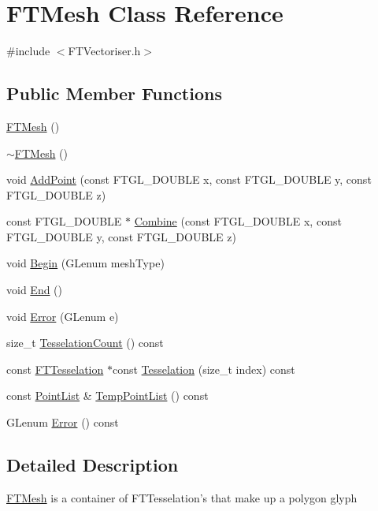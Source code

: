 \hypertarget{class_f_t_mesh}{
\section{FTMesh Class Reference}
\label{class_f_t_mesh}
}


{\ttfamily \#include $<$FTVectoriser.h$>$}

\subsection*{Public Member Functions}
\begin{DoxyCompactItemize}
\item 
\hyperlink{class_f_t_mesh_aa78f98bec8f9cd15d0255c326b7cf62d}{FTMesh} ()
\item 
\hyperlink{class_f_t_mesh_a7282fec857e649bf91c91b2957f292ac}{$\sim$FTMesh} ()
\item 
void \hyperlink{class_f_t_mesh_a4a503faa60d78f67cd487611b0f44b68}{AddPoint} (const FTGL\_\-DOUBLE x, const FTGL\_\-DOUBLE y, const FTGL\_\-DOUBLE z)
\item 
const FTGL\_\-DOUBLE $\ast$ \hyperlink{class_f_t_mesh_a41c229d00a0edd342fff2577c7024dae}{Combine} (const FTGL\_\-DOUBLE x, const FTGL\_\-DOUBLE y, const FTGL\_\-DOUBLE z)
\item 
void \hyperlink{class_f_t_mesh_a03ddbeb4313ce4353c477d0afcdc4a1e}{Begin} (GLenum meshType)
\item 
void \hyperlink{class_f_t_mesh_a1ead56fbe963c5976ea3c268b8b0544d}{End} ()
\item 
void \hyperlink{class_f_t_mesh_a2e07adc55441296e88b6886c153c50fd}{Error} (GLenum e)
\item 
size\_\-t \hyperlink{class_f_t_mesh_a21075ff9bd0534574aede7f72fd33281}{TesselationCount} () const 
\item 
const \hyperlink{class_f_t_tesselation}{FTTesselation} $\ast$const \hyperlink{class_f_t_mesh_a5d8f540f3f6497209b91b53a3daa4190}{Tesselation} (size\_\-t index) const 
\item 
const \hyperlink{class_f_t_list}{PointList} \& \hyperlink{class_f_t_mesh_ac75f054b4e430c12d1f098070713acbb}{TempPointList} () const 
\item 
GLenum \hyperlink{class_f_t_mesh_ac706276fad2215121ffb1fdf1acffa8f}{Error} () const 
\end{DoxyCompactItemize}


\subsection{Detailed Description}
\hyperlink{class_f_t_mesh}{FTMesh} is a container of FTTesselation's that make up a polygon glyph 

